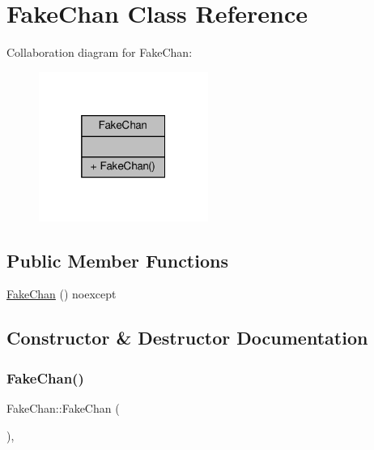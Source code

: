 \hypertarget{classFakeChan}{}\section{Fake\+Chan Class Reference}
\label{classFakeChan}


Collaboration diagram for Fake\+Chan\+:\nopagebreak
\begin{figure}[H]
\begin{center}
\leavevmode
\includegraphics[width=157pt]{classFakeChan__coll__graph}
\end{center}
\end{figure}
\subsection*{Public Member Functions}
\begin{DoxyCompactItemize}
\item 
\hyperlink{classFakeChan_ad3563b881623aa552d98e78c24baef6c}{Fake\+Chan} () noexcept
\end{DoxyCompactItemize}


\subsection{Constructor \& Destructor Documentation}
\mbox{\label{classFakeChan_ad3563b881623aa552d98e78c24baef6c}} 
\subsubsection{\texorpdfstring{Fake\+Chan()}{FakeChan()}}
{\footnotesize\ttfamily Fake\+Chan\+::\+Fake\+Chan (\begin{DoxyParamCaption}{ }\end{DoxyParamCaption})\hspace{0.3cm}{\ttfamily [inline]}, {\ttfamily [noexcept]}}

